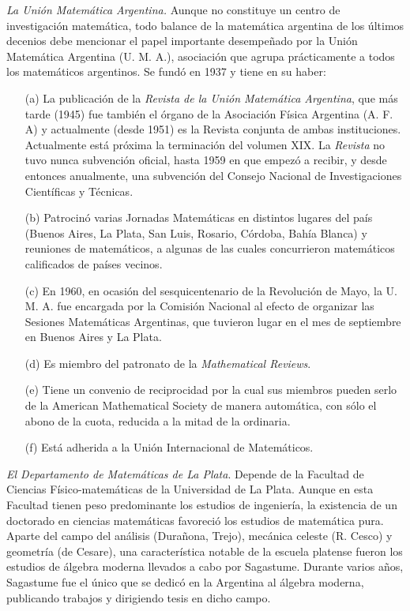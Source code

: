 \emph{La Unión Matemática Argentina.} Aunque no constituye un centro de
investigación matemática, todo balance de la matemática argentina de los
últimos decenios debe mencionar el papel importante desempeñado por la Unión
Matemática Argentina (U. M. A.), asociación que agrupa prácticamente a todos
los matemáticos argentinos. Se fundó en 1937 y tiene en su haber: 
\begin{enumerate}
	\item[(a)] La publicación de la \emph{Revista de la Unión Matemática Argentina},
		que más tarde (1945) fue también el órgano de la Asociación Física
		Argentina (A. F. A) y actualmente (desde 1951) es la Revista conjunta
		de ambas instituciones.  Actualmente está próxima la terminación del
		volumen XIX. La \emph{Revista} no tuvo nunca subvención oficial, hasta
		1959 en que empezó a recibir, y desde entonces anualmente, una
		subvención del Consejo Nacional de Investigaciones Científicas y
		Técnicas. 
	\item[(b)] Patrocinó varias Jornadas Matemáticas en distintos lugares del país
		(Buenos Aires, La Plata, San Luis, Rosario, Córdoba, Bahía Blanca) y
		reuniones de matemáticos, a algunas de las cuales concurrieron
		matemáticos calificados de países vecinos. 
	\item[(c)] En 1960, en ocasión del sesquicentenario de la Revolución de Mayo, la
		U. M. A. fue encargada por la Comisión Nacional al efecto de organizar
		las Sesiones Matemáticas Argentinas, que tuvieron lugar en el mes de
		septiembre en Buenos Aires y La Plata.
	\item[(d)] Es miembro del patronato de la \emph{Mathematical Reviews}.
	\item[(e)] Tiene un convenio de reciprocidad por la cual sus miembros pueden
		serlo de la American Mathematical Society de manera automática, con
		sólo el abono de la cuota, reducida a la mitad de la ordinaria. 
	\item[(f)] Está adherida a la Unión Internacional de Matemáticos.
\end{enumerate}

\emph{El Departamento de Matemáticas de La Plata}. Depende de la Facultad de
Ciencias Físico-matemáticas de la Universidad de La Plata. Aunque en esta
Facultad tienen peso predominante los estudios de ingeniería, la existencia de
un doctorado en ciencias matemáticas favoreció los estudios de matemática pura.
Aparte del campo del análisis (Durañona, Trejo), mecánica celeste (R. Cesco) y
geometría (de Cesare), una característica notable de la escuela platense fueron
los estudios de álgebra moderna llevados a cabo por Sagastume. Durante varios
años, Sagastume fue el único que se dedicó en la Argentina al álgebra moderna,
publicando trabajos y dirigiendo tesis en dicho campo.

